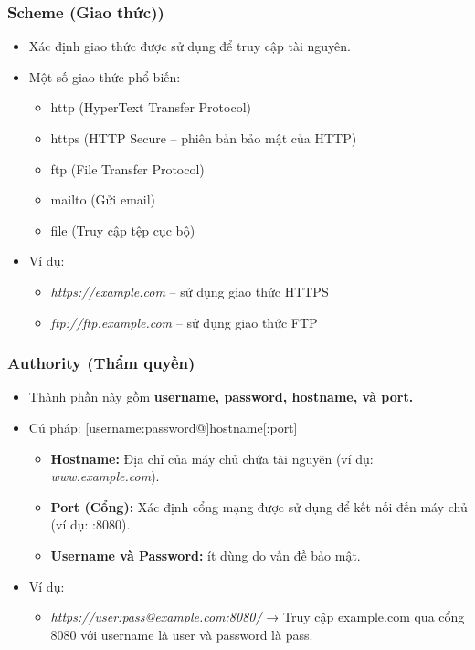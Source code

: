 \documentclass[13pt]{article}
\begin{document}
\subsubsection{Scheme (Giao thức))}
    \begin{itemize}
        \item Xác định giao thức được sử dụng để truy cập tài nguyên.
        \item Một số giao thức phổ biến:
        \begin{itemize}
            \item http (HyperText Transfer Protocol)
            \item https (HTTP Secure – phiên bản bảo mật của HTTP)
            \item ftp (File Transfer Protocol)
            \item mailto (Gửi email)
            \item file (Truy cập tệp cục bộ)
        \end{itemize}
        
        \item Ví dụ:
        \begin{itemize}
            \item \textit{https://example.com} – sử dụng giao thức HTTPS
            \item \textit{ftp://ftp.example.com} – sử dụng giao thức FTP
        \end{itemize}
    \end{itemize}
    
\subsubsection{Authority (Thẩm quyền)}
    \begin{itemize}
        \item Thành phần này gồm \textbf{username, password, hostname, và port.}
        \item Cú pháp: [username:password@]hostname[:port]
        \begin{itemize}
            \item \textbf{Hostname: }Địa chỉ của máy chủ chứa tài nguyên (ví dụ: \textit{ www.example.com}).
            \item \textbf{Port (Cổng):} Xác định cổng mạng được sử dụng để kết nối đến máy chủ (ví dụ: :8080).
            \item \textbf{Username và Password:} ít dùng do vấn đề bảo mật.
        \end{itemize}
        \item Ví dụ:
        \begin{itemize}
            \item \textit{https://user:pass@example.com:8080/}  → Truy cập example.com qua cổng 8080 với username là user và password là pass.
        \end{itemize}

    \end{itemize}
\end{document}
